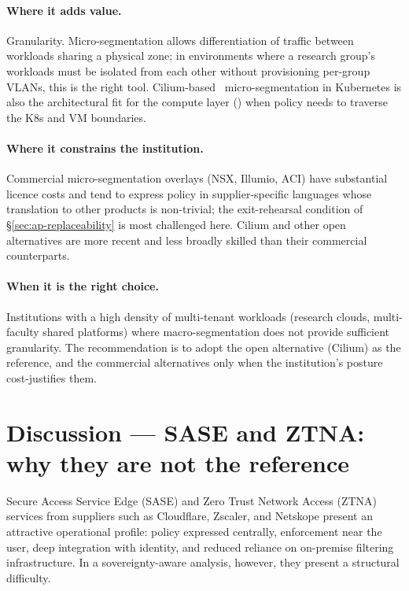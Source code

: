 \paragraph{Where it adds value.} Granularity. Micro-segmentation
allows differentiation of traffic between workloads sharing a
physical zone; in environments where a research group's workloads
must be isolated from each other without provisioning per-group
VLANs, this is the right tool. Cilium-based~\cite{cilium} micro-segmentation in
Kubernetes is also the architectural fit for the compute layer
() when policy needs to traverse the K8s and
VM boundaries.

\paragraph{Where it constrains the institution.} Commercial
micro-segmentation overlays (NSX, Illumio, ACI) have substantial
licence costs and tend to express policy in supplier-specific
languages whose translation to other products is non-trivial; the
exit-rehearsal condition of \S\ref{sec:ap-replaceability} is most challenged here. Cilium
and other open alternatives are more recent and less broadly skilled
than their commercial counterparts.

\paragraph{When it is the right choice.} Institutions with a high
density of multi-tenant workloads (research clouds, multi-faculty
shared platforms) where macro-segmentation does not provide
sufficient granularity. The recommendation is to adopt the open
alternative (Cilium) as the reference, and the commercial
alternatives only when the institution's posture cost-justifies them.

\section{Discussion --- SASE and ZTNA: why they are not the reference}
\label{sec:nw-sase}

Secure Access Service Edge (SASE) and Zero Trust Network Access
(ZTNA) services from suppliers such as Cloudflare, Zscaler, and
Netskope present an attractive operational profile: policy
expressed centrally, enforcement near the user, deep integration
with identity, and reduced reliance on on-premise filtering
infrastructure. In a sovereignty-aware analysis, however, they
present a structural difficulty.

